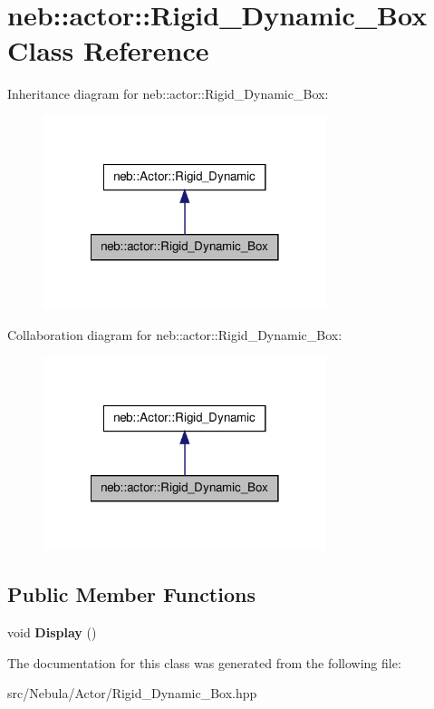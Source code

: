 \hypertarget{classneb_1_1actor_1_1Rigid__Dynamic__Box}{\section{neb\-:\-:actor\-:\-:\-Rigid\-\_\-\-Dynamic\-\_\-\-Box \-Class \-Reference}
\label{classneb_1_1actor_1_1Rigid__Dynamic__Box}
}


\-Inheritance diagram for neb\-:\-:actor\-:\-:\-Rigid\-\_\-\-Dynamic\-\_\-\-Box\-:\nopagebreak
\begin{figure}[H]
\begin{center}
\leavevmode
\includegraphics[width=234pt]{classneb_1_1actor_1_1Rigid__Dynamic__Box__inherit__graph}
\end{center}
\end{figure}


\-Collaboration diagram for neb\-:\-:actor\-:\-:\-Rigid\-\_\-\-Dynamic\-\_\-\-Box\-:\nopagebreak
\begin{figure}[H]
\begin{center}
\leavevmode
\includegraphics[width=234pt]{classneb_1_1actor_1_1Rigid__Dynamic__Box__coll__graph}
\end{center}
\end{figure}
\subsection*{\-Public \-Member \-Functions}
\begin{DoxyCompactItemize}
\item 
\hypertarget{classneb_1_1actor_1_1Rigid__Dynamic__Box_ad2564e54df3b07cc2454ba28a026b765}{void {\bfseries \-Display} ()}\label{classneb_1_1actor_1_1Rigid__Dynamic__Box_ad2564e54df3b07cc2454ba28a026b765}

\end{DoxyCompactItemize}


\-The documentation for this class was generated from the following file\-:\begin{DoxyCompactItemize}
\item 
src/\-Nebula/\-Actor/\-Rigid\-\_\-\-Dynamic\-\_\-\-Box.\-hpp\end{DoxyCompactItemize}

